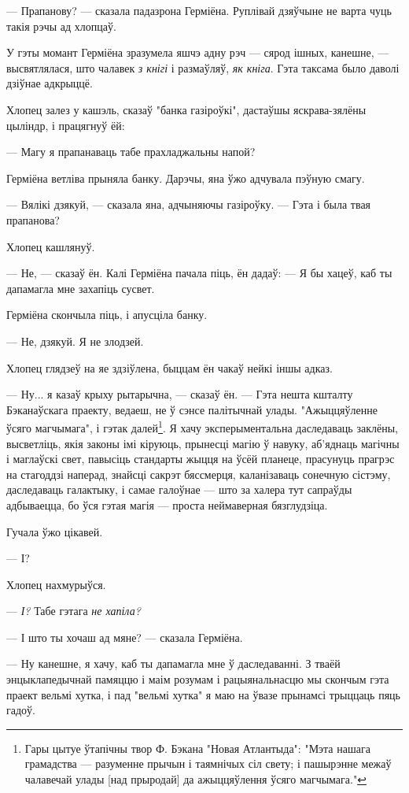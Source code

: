 --- Прапанову? --- сказала падазрона Герміёна. Руплівай дзяўчыне не варта чуць 
такія рэчы ад хлопцаў. 

У гэты момант Герміёна зразумела яшчэ адну рэч --- сярод ішных, канешне, ---
высвятлялася, што чалавек \emph{з кнігі} і размаўляў, \emph{як кніга}.
Гэта таксама было даволі дзіўнае адкрыццё.

Хлопец залез у кашэль, сказаў "банка газіроўкі", дастаўшы яскрава-зялёны цыліндр,
і працягнуў ёй:

--- Магу я прапанаваць табе прахладжальны напой?

Герміёна ветліва прыняла банку. Дарэчы, яна ўжо адчувала пэўную смагу.

--- Вялікі дзякуй, --- сказала яна, адчыняючы газіроўку. --- Гэта і была 
твая прапанова?

Хлопец кашлянуў. 

--- Не, --- сказаў ён. Калі Герміёна пачала піць, ён дадаў: --- Я бы хацеў, 
каб ты дапамагла мне захапіць сусвет.

Герміёна скончыла піць, і апусціла банку. 

--- Не, дзякуй. Я не злодзей.

Хлопец глядзеў на яе здзіўлена, быццам ён чакаў нейкі іншы адказ. 

--- Ну... я казаў крыху рытарычна, --- сказаў ён. --- Гэта нешта кшталту Бэканаўскага
праекту, ведаеш, не ў сэнсе палітычнай улады. "Ажыццяўленне ўсяго магчымага", і гэтак
далей\footnote{{} Гары цытуе ўтапічны твор Ф. Бэкана "Новая Атлантыда": 
"Мэта нашага грамадства --- разуменне прычын і таямнічых сіл свету; і пашырэнне
межаў чалавечай улады [над прыродай] да ажыццяўлення ўсяго магчымага."}. 
Я хачу эксперыментальна даследаваць заклёны, высветліць, якія законы імі 
кіруюць, прынесці магію ў навуку, аб'яднаць магічны і маглаўскі свет, 
павысіць стандарты жыцця на ўсёй планеце, прасунуць прагрэс на стагоддзі наперад,
знайсці сакрэт бяссмерця, каланізаваць сонечную сістэму, даследаваць галактыку, 
і самае галоўнае --- што за халера тут сапраўды адбываецца, бо ўся гэтая магія 
--- проста неймаверная бязглудзіца.

Гучала ўжо цікавей.

--- І?

Хлопец нахмурыўся.

--- \emph{І?} Табе гэтага \emph{не хапіла?}

--- І што ты хочаш ад мяне? --- сказала Герміёна.

--- Ну канешне, я хачу, каб ты дапамагла мне ў даследаванні. З тваёй энцыклапедычнай
памяццю і маім розумам і  рацыянальнасцю мы скончым гэта праект вельмі хутка, і пад "вельмі хутка" 
я маю на ўвазе прынамсі трыццаць пяць гадоў.

